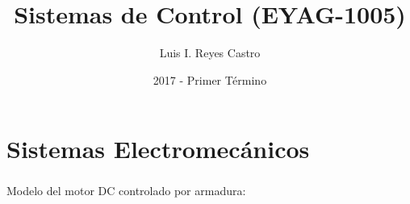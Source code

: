 \documentclass[ 10pt, xcolor = dvipsnames]{beamer}
\title[Sistemas de Control]{Sistemas de Control (EYAG-1005) }
\author[L. I. Reyes Castro]{Luis I. Reyes Castro}
\institute[ESPOL]{\normalsize Escuela Superior Polit\'ecnica del Litoral (ESPOL) \\ Guayaquil - Ecuador}
\date[2017-T1]{2017 - Primer T\'ermino}
\begin{document}


\section{Sistemas Electromec\'anicos}

\begin{frame}[allowframebreaks]
\frametitle{\insertsection}

Modelo del motor DC controlado por armadura: 
\begin{figure}[htb]
\centering
\def\svgwidth{0.9\columnwidth}

\end{figure}

\end{frame}
\end{document}
